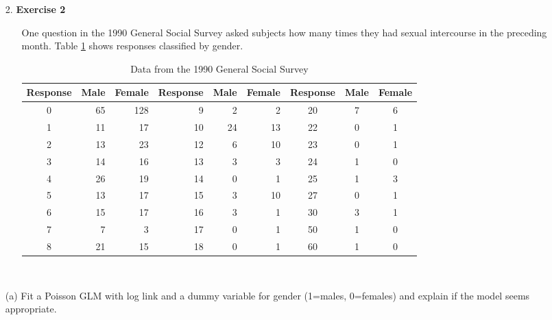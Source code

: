 \documentclass[]{article}
\begin{document}
\begin{itemize}
     \item[2.] {\bf Exercise 2}
     
          
     \begin{itemize}
     \item[]
     One question in the 1990 General Social Survey asked subjects how many times they had sexual intercourse in the preceding month. Table \ref{table:exo2} shows responses classified by gender.
\begin{table}[h]
\begin{center}
\begin{tabular}{crr|rrr|ccc} \hline
Response & Male & Female & Response & Male & Female & Response & Male & Female \\ \hline
0 & 65 & 128 & 9 & 2 & 2 & 20 & 7 & 6 \\
1 & 11 & 17 & 10 & 24 & 13 & 22 & 0 & 1 \\
2 & 13 & 23 & 12 & 6 & 10 & 23 & 0 & 1 \\
3 & 14 & 16 & 13 & 3 & 3 & 24 & 1 & 0 \\
4 & 26 & 19 & 14 & 0 & 1 & 25 & 1 & 3 \\
5 & 13 & 17 & 15 & 3 & 10 & 27 & 0 & 1 \\
6 & 15 & 17 & 16 & 3 & 1 & 30 & 3 & 1 \\
7 & 7 & 3 & 17 & 0 & 1 & 50 & 1 & 0 \\
8 & 21 & 15 & 18 & 0 & 1 & 60 & 1 & 0 \\ \hline
\end{tabular}
\caption{Data from the 1990 General Social Survey} \label{table:exo2}
\end{center}
\end{table}

     
 \end{itemize} 
 \end{itemize}

~

\begin{itemize} 
     \item[(a)] Fit a Poisson GLM with log link and a dummy variable for gender (1=males, 0=females) and explain if the model seems appropriate.

 \end{itemize}

~
\end{document}
